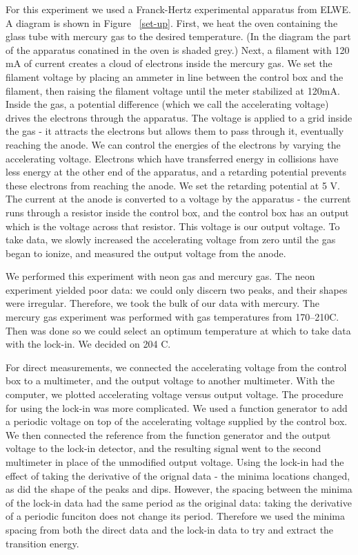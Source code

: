 \documentclass[prb,preprint]{revtex4-1}
\begin{document}
For this experiment we used a Franck-Hertz experimental apparatus from ELWE. A diagram is shown in Figure ~\ref{set-up}. 
First, we heat the oven containing the glass tube with mercury gas to the desired temperature. 
(In the diagram the part of the apparatus conatined in the oven is shaded grey.) 
Next, a filament with 120 mA of current creates a cloud of electrons inside the mercury gas. 
We set the filament voltage by placing an ammeter in line between the control box and the filament, then raising the filament voltage until the meter stabilized at 120mA. 
Inside the gas, a potential difference (which we call the accelerating voltage) drives the electrons through the apparatus. 
The voltage is applied to a grid inside the gas - it attracts the electrons but allows them to pass through it, eventually reaching the anode. 
We can control the energies of the electrons by varying the accelerating voltage. 
Electrons which have transferred energy in collisions have less energy at the other end of the apparatus, and a retarding potential prevents these electrons from reaching the anode. 
We set the retarding potential at 5 V. %
The current at the anode is converted to a voltage by the apparatus - the current runs through a resistor inside the control box, and the control box has an output which is the voltage across that resistor. 
This voltage is our output voltage. 
To take data, we slowly increased the accelerating voltage from zero until the gas began to ionize, and measured the output voltage from the anode. 

We performed this experiment with neon gas and mercury gas. 
The neon experiment yielded poor data: we could only discern two peaks, and their shapes were irregular. 
Therefore, we took the bulk of our data with mercury. 
The mercury gas experiment was performed with gas temperatures from 170\degree--210\degree C. 
Then was done so we could select an optimum temperature at which to take data with the lock-in. 
We decided on 204 \degree C. 

For direct measurements, we connected the accelerating voltage from the control box to a multimeter, and the output voltage to another multimeter. 
With the computer, we plotted accelerating voltage versus output voltage. 
The procedure for using the lock-in was more complicated. 
We used a function generator to add a periodic voltage on top of the accelerating voltage supplied by the control box. 
We then connected the reference from the function generator and the output voltage to the lock-in detector, and the resulting signal went to the second multimeter in place of the unmodified output voltage. 
Using the lock-in had the effect of taking the derivative of the orignal data - the minima locations changed, as did the shape of the peaks and dips. 
However, the spacing between the minima of the lock-in data had the same period as the original data: taking the derivative of a periodic funciton does not change its period. 
Therefore we used the minima spacing from both the direct data and the lock-in data to try and extract the transition energy. 
\end{document}
